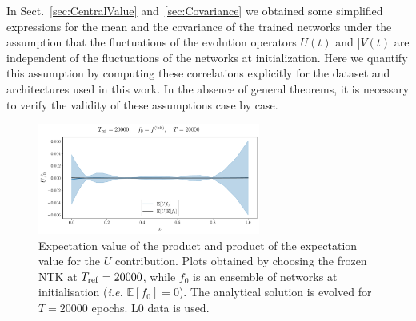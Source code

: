 


In Sect.~\ref{sec:CentralValue} and~\ref{sec:Covariance} we obtained some simplified expressions 
for the mean and the covariance of the trained networks under the assumption that the fluctuations
of the evolution operators $U(t)$ and |$V(t)$ are independent of the fluctuations of the networks 
at initialization. Here we quantify this assumption by computing these correlations explicitly 
for the dataset and architectures used in this work. In the absence of general theorems, it is necessary 
to verify the validity of these assumptions case by case. 

\begin{figure}[t!]
  \label{fig:xT3_exp_val}
  \centering
  \includegraphics[width=0.65\textwidth]{plots/u_v_studies/u_f0_independence_20000_L0.pdf}
  \caption{Expectation value of the product and product of the expectation value
  for the $U$ contribution. Plots obtained by choosing the frozen NTK at $T_{\rm
  ref} = 20000$, while $f_0$ is an ensemble of networks at initialisation
  (\textit{i.e.} $\mathbb{E}[f_0]=0$). The analytical solution is evolved for
  $T=20000$ epochs. L0 data is used.}
\end{figure}
